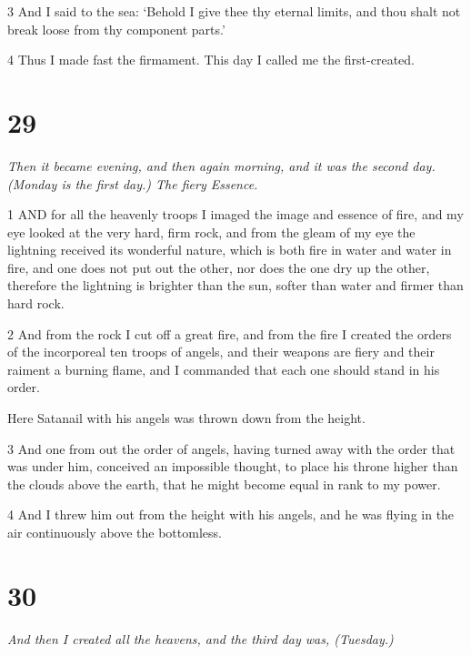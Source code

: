 \par 3 And I said to the sea: ‘Behold I give thee thy eternal limits, and thou shalt not break loose from thy component parts.’

\par 4 Thus I made fast the firmament. This day I called me the first-created.

\chapter{29}

\par \textit{Then it became evening, and then again morning, and it was the second day. (Monday is the first day.) The fiery Essence.}

\par 1 AND for all the heavenly troops I imaged the image and essence of fire, and my eye looked at the very hard, firm rock, and from the gleam of my eye the lightning received its wonderful nature, which is both fire in water and water in fire, and one does not put out the other, nor does the one dry up the other, therefore the lightning is brighter than the sun, softer than water and firmer than hard rock.

\par 2 And from the rock I cut off a great fire, and from the fire I created the orders of the incorporeal ten troops of angels, and their weapons are fiery and their raiment a burning flame, and I commanded that each one should stand in his order.

Here Satanail with his angels was thrown down from the height.

\par 3 And one from out the order of angels, having turned away with the order that was under him, conceived an impossible thought, to place his throne higher than the clouds above the earth, that he might become equal in rank to my power.

\par 4 And I threw him out from the height with his angels, and he was flying in the air continuously above the bottomless.

\chapter{30}

\par \textit{And then I created all the heavens, and the third day was, (Tuesday.)}

